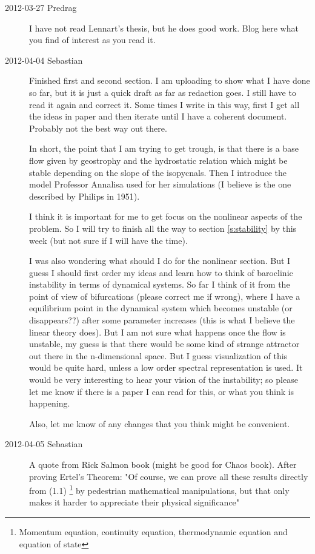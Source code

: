 \begin{description}
\item[2012-03-27 Predrag] I have not read Lennart's thesis, but he does good work. Blog
here what you find of interest as you read it.

\item[2012-04-04 Sebastian]
Finished first and second section. I am uploading to show what I have done so far, but it is just a quick draft as far as redaction goes. I still have to read it again and correct it. Some times I write in this way, first I get all the ideas in paper and then iterate until I have a coherent document. Probably not the best way out there.

In short, the point that I am trying to get trough, is that there is a base flow given by geostrophy and the hydrostatic relation which might be stable depending on the slope of the isopycnals. Then I introduce the model Professor Annalisa used for her simulations (I believe is the one described by Philips in 1951).

I think it is important for me to get focus on the nonlinear aspects of the problem. So I will try to finish all the way to section \ref{s:stability} by this week (but not sure if I will have the time).

I was also wondering what should I do for the nonlinear section. But I guess I should first order my ideas and learn how to think of baroclinic instability in terms of dynamical systems. So far I think of it from the point of view of bifurcations (please correct me if wrong), where I have a equilibrium point in the dynamical system which becomes unstable (or disappears??) after some parameter increases (this is what I believe the linear theory does). But I am not sure what happens once the flow is unstable, my guess is that there would be some kind of strange attractor out there in the n-dimensional space. But I guess visualization of this would be quite hard, unless a low order spectral representation is used. It would be very interesting to hear your vision of the instability; so please let me know if there is a paper I can read for this, or what you think is happening.

Also, let me know of any changes that you think might be convenient.

\item[2012-04-05 Sebastian]
A quote from Rick Salmon book (might be good for Chaos book). After proving Ertel's Theorem: "Of course, we can prove all these results directly from (1.1) \footnote{Momentum equation, continuity equation, thermodynamic equation and equation of state} by pedestrian mathematical manipulations, but that only makes it harder to appreciate their physical significance"
\end{description}
